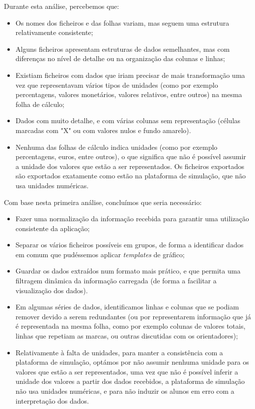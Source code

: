Durante esta análise, percebemos que:

\begin{itemize}
    \item Os nomes dos ficheiros e das folhas variam, mas seguem uma estrutura relativamente consistente;
    \item Alguns ficheiros apresentam estruturas de dados semelhantes, mas com diferenças no nível de detalhe ou na organização das colunas e linhas;
    \item Existiam ficheiros com dados que iriam precisar de mais transformação uma vez que representavam vários tipos de unidades (como por exemplo percentagens, valores monetários, valores relativos, entre outros) na mesma folha de cálculo;
    \item Dados com muito detalhe, e com várias colunas sem representação (células marcadas com "X" ou com valores nulos e fundo amarelo).
    \item Nenhuma das folhas de cálculo indica unidades (como por exemplo percentagens, euros, entre outros), o que significa que não é possível assumir a unidade dos valores que estão a ser representados. Os ficheiros exportados são exportados exatamente como estão na plataforma de simulação, que não usa unidades numéricas.
\end{itemize}

Com base nesta primeira análise, concluímos que seria necessário:
\begin{itemize}
    \item Fazer uma normalização da informação recebida para garantir uma utilização consistente da aplicação;
    \item Separar os vários ficheiros possíveis em grupos, de forma a identificar dados em comum que pudéssemos aplicar \textit{templates} de gráfico;
    \item Guardar os dados extraídos num formato mais prático, e que permita uma filtragem dinâmica da informação carregada (de forma a facilitar a visualização dos dados).
    \item Em algumas séries de dados, identificamos linhas e colunas que se podiam remover devido a serem redundantes (ou por representarem informação que já é representada na mesma folha, como por exemplo colunas de valores totais, linhas que repetiam as marcas, ou outras discutidas com os orientadores);
    \item Relativamente à falta de unidades, para manter a consistência com a plataforma de simulação, optámos por não assumir nenhuma unidade para os valores que estão a ser representados, uma vez que não é possível inferir a unidade dos valores a partir dos dados recebidos, a plataforma de simulação não usa unidades numéricas, e para não induzir os alunos em erro com a interpretação dos dados.
\end{itemize}

